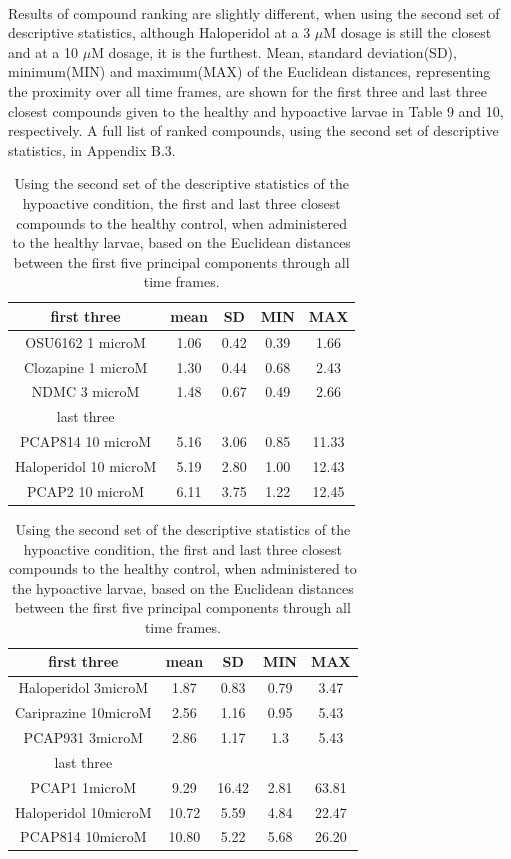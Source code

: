\documentclass[a4paper,12pt]{article}
\begin{document}
\\
Results of compound ranking are slightly different, when using the second set of descriptive statistics, although Haloperidol at a 3 $\mu$M dosage is still the closest and at a 10 $\mu$M dosage, it is the furthest. Mean, standard deviation(SD), minimum(MIN) and maximum(MAX) of the Euclidean distances, representing the proximity over all time frames, are shown for the first three and last three closest compounds given to the healthy and hypoactive larvae in Table 9 and 10, respectively. A full list of ranked compounds, using the second set of descriptive statistics, in Appendix B.3.
\begin{table}[h!]\tiny
\centering
\begin{tabular}{|c|c|c|c|c|}
\hline
first three          & mean & SD   & MIN  & MAX   \\ \hline
OSU6162 1 microM       & 1.06 & 0.42 & 0.39 & 1.66  \\ \hline
Clozapine 1 microM     & 1.30  & 0.44 & 0.68 & 2.43  \\ \hline
NDMC 3 microM          & 1.48 & 0.67 & 0.49 & 2.66  \\ \hline
last three           & \multicolumn{4}{c|}{}      \\ \hline
PCAP814 10 microM      & 5.16 & 3.06 & 0.85 & 11.33 \\ \hline
Haloperidol 10 microM  & 5.19 & 2.80  & 1.00    & 12.43 \\ \hline
PCAP2 10 microM        & 6.11 & 3.75 & 1.22 & 12.45 \\ \hline
\end{tabular}
\caption{Using the second set of the descriptive statistics of the hypoactive condition, the first and last three closest compounds to the healthy control, when administered to the healthy larvae, based on the Euclidean distances between the first five principal components through all time frames.}
\end{table}
\begin{table}[h!]\tiny
\centering
\begin{tabular}{|c|c|c|c|c|}
\hline
first three          & mean & SD    & MIN  & MAX   \\ \hline
Haloperidol 3microM   & 1.87  & 0.83  & 0.79 & 3.47  \\ \hline
Cariprazine 10microM  & 2.56  & 1.16  & 0.95 & 5.43  \\ \hline
PCAP931 3microM       & 2.86  & 1.17  & 1.3  & 5.43  \\ \hline
last three           & \multicolumn{4}{c|}{}       \\ \hline
PCAP1 1microM         & 9.29  & 16.42 & 2.81 & 63.81 \\ \hline
Haloperidol 10microM  & 10.72 & 5.59  & 4.84 & 22.47 \\ \hline
PCAP814 10microM      & 10.80  & 5.22  & 5.68 & 26.20  \\ \hline
\end{tabular}
\caption{Using the second set of the descriptive statistics of the hypoactive condition, the first and last three closest compounds to the healthy control, when administered to the hypoactive larvae, based on the Euclidean distances between the first five principal components through all time frames.}
\end{table}
\end{document}
